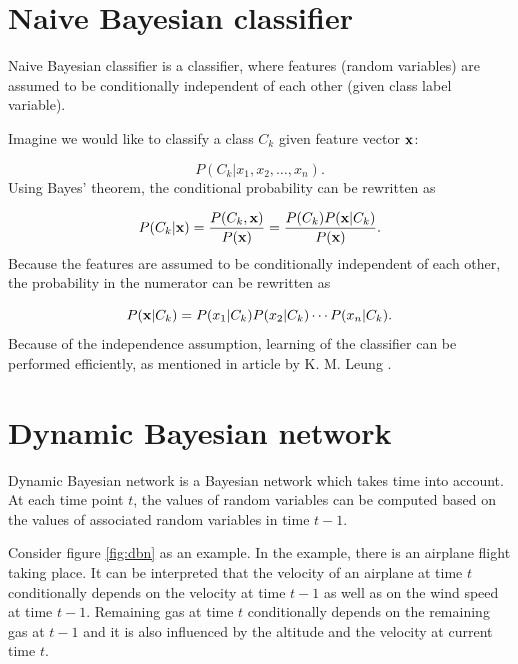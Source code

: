 \documentclass[thesis=B,english]{FITthesis}[2012/06/26]
\begin{document}
\section{Naive Bayesian classifier}

Naive Bayesian classifier is a classifier, where features (random variables) are assumed to be conditionally independent of each other (given class label variable).

Imagine we would like to classify a class $C_k$ given feature vector $\textbf x$:

\begin{equation*}
P(C_k | x_1, x_2, \dots, x_n).
\end{equation*}
Using Bayes' theorem, the conditional probability can be rewritten as

\begin{equation*}
P(C_k | \textbf x) = \frac{P(C_k,\textbf x)}{P(\textbf x)} = \frac{P(C_k) P(\textbf x | C_k)}{P(\textbf x)}.
\end{equation*}
Because the features are assumed to be conditionally independent of each other, the probability in the numerator can be rewritten as

\begin{equation*}
P(\textbf x | C_k) = P(x_1|C_k) P(x_2|C_k) \cdots P(x_n|C_k).
\end{equation*}
Because of the independence assumption, learning of the classifier can be performed efficiently, as mentioned in article by K. M. Leung \cite{naive-bayesian-classifier}.

\section{Dynamic Bayesian network}

Dynamic Bayesian network is a Bayesian network which takes time into account. At each time point $t$, the values of random variables can be computed based on the values of associated random variables in time $t-1$.

Consider figure \ref{fig:dbn} as an example. In the example, there is an airplane flight taking place. It can be interpreted that the velocity of an airplane at time $t$ conditionally depends on the velocity at time $t-1$ as well as on the wind speed at time $t-1$. Remaining gas at time $t$ conditionally depends on the remaining gas at $t-1$ and it is also influenced by the altitude and the velocity at current time $t$.
\end{document}
